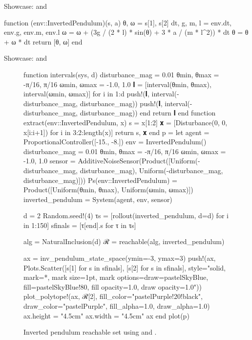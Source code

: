 \begin{frame}[fragile]{Showcase: \normalfont{} and }

{\small
\begin{algorithmblock}
\begin{juliaverbatim}
function (env::InvertedPendulum)(s, a)
    θ, ω = s[1], s[2]
    dt, g, m, l = env.dt, env.g, env.m, env.l
    ω = ω + (3g / (2 * l) * sin(θ) + 3 * a / (m * l^2)) * dt
    θ = θ + ω * dt
    return [θ, ω]
end
\end{juliaverbatim}
\end{algorithmblock}
}

\end{frame}


\begin{frame}[fragile]{Showcase: \normalfont{} and }
    
\begin{figure}
    \begin{jlcode}
    function intervals(sys, d)
        disturbance_mag = 0.01
        θmin, θmax = -π/16, π/16
        ωmin, ωmax =  -1.0, 1.0
        𝐈 = [interval(θmin, θmax), interval(ωmin, ωmax)]
        for i in 1:d
            push!(𝐈, interval(-disturbance_mag, disturbance_mag))
            push!(𝐈, interval(-disturbance_mag, disturbance_mag))
        end
        return 𝐈
    end
    function extract(env::InvertedPendulum, x)
        s = x[1:2]
        𝐱 = [Disturbance(0, 0, x[i:i+1]) for i in 3:2:length(x)]
        return s, 𝐱
    end
    p = let
        agent = ProportionalController([-15., -8.])
        env = InvertedPendulum()
        disturbance_mag = 0.01
        θmin, θmax = -π/16, π/16
        ωmin, ωmax =  -1.0, 1.0
        sensor = AdditiveNoiseSensor(Product([Uniform(-disturbance_mag, disturbance_mag), Uniform(-disturbance_mag, disturbance_mag)]))
        Ps(env::InvertedPendulum) = Product([Uniform(θmin, θmax), Uniform(ωmin, ωmax)])
        inverted_pendulum = System(agent, env, sensor)

        d = 2
        Random.seed!(4)
        τs = [rollout(inverted_pendulum, d=d) for i in 1:150]
        sfinals = [τ[end].s for τ in τs]

        alg = NaturalInclusion(d)
        ℛ = reachable(alg, inverted_pendulum)

        ax = inv_pendulum_state_space(ymin=-3, ymax=3)
        push!(ax, Plots.Scatter([s[1] for s in sfinals], [s[2] for s in sfinals], 
            style="solid, mark=*, mark size=1pt, mark options={draw=pastelSkyBlue, fill=pastelSkyBlue!80, fill opacity=1.0, draw opacity=1.0}"))
        plot_polytope!(ax, ℛ[2], fill_color="pastelPurple!20!black", draw_color="pastelPurple", fill_alpha=1.0, draw_alpha=1.0)
        ax.height = "4.5cm"
        ax.width = "4.5cm"
        ax
    end
    plot(p)
    \end{jlcode}
    \begin{center}
    \end{center}
    \caption{Inverted pendulum reachable set using  and .}
\end{figure}

\end{frame}
